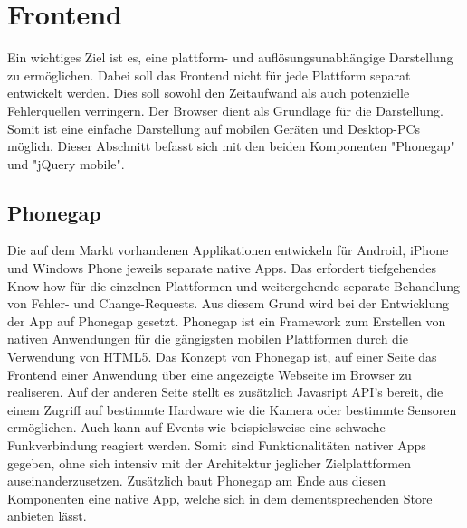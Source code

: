 \documentclass[10pt, conference, compsocconf]{IEEEtran}
\begin{document}
\section{Frontend}
Ein wichtiges Ziel ist es, eine plattform- und aufl\"osungsunabh\"angige Darstellung zu erm\"oglichen. 
Dabei soll das Frontend nicht f\"ur jede Plattform separat entwickelt werden.
Dies soll sowohl den Zeitaufwand als auch potenzielle Fehlerquellen verringern. 
Der Browser dient als Grundlage f\"ur die Darstellung. 
Somit ist eine einfache Darstellung auf mobilen Ger\"aten und Desktop-PCs m\"oglich.
Dieser Abschnitt befasst sich mit den beiden Komponenten "Phonegap" und "jQuery mobile".

\subsection{Phonegap}
Die auf dem Markt vorhandenen Applikationen entwickeln f\"ur Android, iPhone und Windows Phone jeweils se\-parate native Apps. 
Das erfordert tiefgehendes Know-how f\"ur die einzelnen Plattformen und weitergehende separate Behandlung von Fehler- und Change-Requests. 
Aus diesem Grund wird bei der Entwicklung der App auf Phonegap gesetzt. Phonegap ist ein Framework zum Erstellen von nativen Anwendungen f\"ur die g\"angigsten mobilen Plattformen durch die Verwendung von HTML5.
Das Konzept von Phonegap ist, auf einer Seite das Frontend einer Anwendung \"uber eine angezeigte Webseite im Browser zu realiseren. 
Auf der anderen Seite stellt es zus\"atzlich Javasript API's bereit, die einem Zugriff auf bestimmte Hardware wie die Kamera oder bestimmte Sensoren erm\"oglichen. 
Auch kann auf Events wie beispielsweise eine schwache Funkverbindung reagiert werden. 
Somit sind Funktionalit\"aten nativer Apps gegeben, ohne sich intensiv mit der Architektur jeglicher Zielplattformen auseinanderzusetzen.
Zus\"atzlich baut Phonegap am Ende aus diesen Komponenten eine native App, welche sich in dem dementsprechenden Store anbieten l\"asst.
\end{document}
